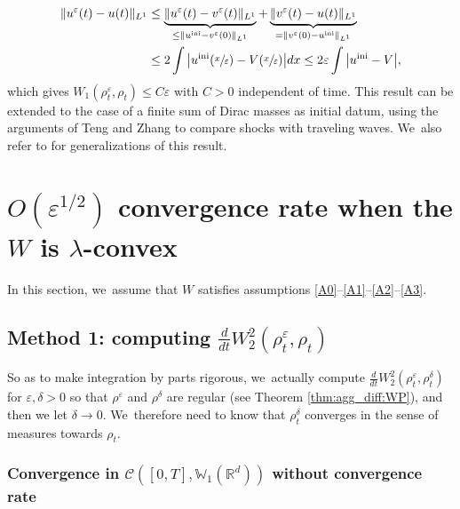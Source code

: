 \documentclass[11pt]{article}
\numberwithin{equation}{section}
\newcommand{\ini}{\mathrm{ini}}
\def\RR{\mathbb{R}}
\def\WW{\mathbb{W}}
\def\eps{\varepsilon}
\def\calC{{\mathcal C}}
\theoremstyle{plain}
\theoremstyle{definition}
\begin{document}
\begin{align*}
\|u^\eps(t) - u(t)\|_{L^1} &\leq \underbrace{\|u^\eps(t) - v^\eps(t)\|_{L^1}}_{\leq \|u^{\ini} - v^\eps(0)\|_{L^1}} + \underbrace{\|v^\eps(t) - u(t)\|_{L^1}}_{=\|v^\eps(0) - u^{\ini}\|_{L^1}}\\
&\leq 2 \int \big| u^{\ini}(\sfrac{x}{\eps}) - V(\sfrac{x}{\eps}) \big| dx
\leq 2 \eps \int \big| u^{\ini} - V \big|,
\end{align*}
which gives $W_1(\rho^\eps_t, \rho_t) \leq C\eps$ with $C>0$ independent of time. This result can be extended to the case of a finite sum of Dirac masses as initial datum, using the arguments of Teng and Zhang \cite{tengzhang97} to compare shocks with traveling waves. We~also refer to \cite{tang2001, tangteng97, teng98} for generalizations of this result.

\section{\texorpdfstring{$O(\eps^{1/2})$ convergence rate when the $W$ is $\lambda$-convex}{titlesection}}\label{section:lambdaConvex}

In this section, we~assume that $W$ satisfies assumptions \eqref{A0}--\eqref{A1}--\eqref{A2}--\eqref{A3}.

\subsection{Method 1: computing $\frac{d}{dt} W_2^2(\rho_t^\eps, \rho_t)$}\label{section:lambdaConvex:1}

So as to make integration by parts rigorous, we~actually compute $\frac{d}{dt} W_2^2(\rho_t^\eps, \rho_t^\delta)$ for $\eps,\delta >0$ so that $\rho^\eps$ and $\rho^\delta$ are regular (see Theorem \ref{thm:agg_diff:WP}), and then we let $\delta \to 0$. We~therefore need to know that $\rho_t^\delta$ converges in the sense of measures towards $\rho_t$.

\subsubsection{Convergence in $\calC([0,T], \WW_1(\RR^d))$ without convergence rate}
\end{document}
